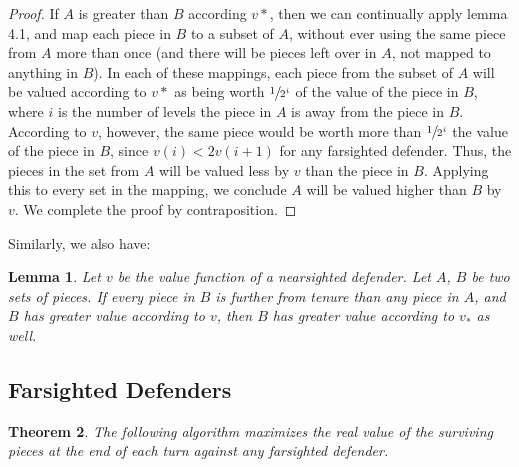 \documentclass{article}
\theoremstyle{plain}
\newtheorem{thm}{Theorem}[section]
\newtheorem{lem}[thm]{Lemma}
\theoremstyle{definition}
\theoremstyle{remark}
\begin{document}
\begin{proof}
 If $A$ is greater than $B$ according $v*$, then we can continually apply lemma 4.1, and map each piece in $B$ to a subset of $A$, without ever using the same piece from $A$ more than once (and there will be pieces left over in $A$, not mapped to anything in $B$). In each of these mappings, each piece from the subset of $A$ will be valued according to $v*$ as being worth $\sfrac{1}{2^i}$ of the value of the piece in $B$, where $i$ is the number of levels the piece in $A$ is away from the piece in $B$. \\
 
According to $v$, however, the same piece would be worth more than $\sfrac{1}{2^i}$ the value of the piece in $B$, since $v(i) < 2v(i+1)$ for any farsighted defender. Thus, the pieces in the set from $A$ will be valued less by $v$ than the piece in $B$. Applying this to every set in the mapping, we conclude $A$ will be valued higher than $B$ by $v$. We complete the proof by contraposition.
\end{proof}

Similarly, we also have:

\begin{lem}
Let $v$ be the value function of a nearsighted defender. Let $A$, $B$ be two sets of pieces. If every piece in $B$ is further from tenure than any piece in $A$, and $B$ has greater value according to $v$, then $B$ has greater value according to $v_{*}$ as well.
\end{lem}


\subsection{Farsighted Defenders}

\begin{thm}
  The following algorithm maximizes the real value of the surviving pieces at the end of each turn against any farsighted defender.
\end{thm}
\end{document}
